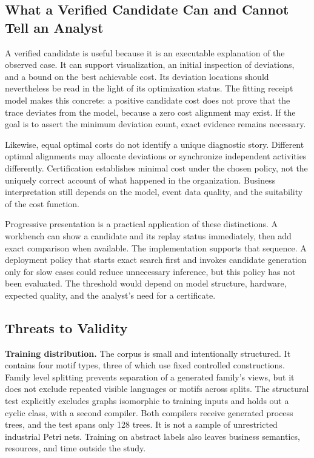 \subsection{What a Verified Candidate Can and Cannot Tell an Analyst}

A verified candidate is useful because it is an executable explanation of the observed case. It can support visualization, an initial inspection of deviations, and a bound on the best achievable cost. Its deviation locations should nevertheless be read in the light of its optimization status. The fitting receipt model makes this concrete: a positive candidate cost does not prove that the trace deviates from the model, because a zero cost alignment may exist. If the goal is to assert the minimum deviation count, exact evidence remains necessary.

Likewise, equal optimal costs do not identify a unique diagnostic story. Different optimal alignments may allocate deviations or synchronize independent activities differently. Certification establishes minimal cost under the chosen policy, not the uniquely correct account of what happened in the organization. Business interpretation still depends on the model, event data quality, and the suitability of the cost function.

Progressive presentation is a practical application of these distinctions. A workbench can show a candidate and its replay status immediately, then add exact comparison when available. The implementation supports that sequence. A deployment policy that starts exact search first and invokes candidate generation only for slow cases could reduce unnecessary inference, but this policy has not been evaluated. The threshold would depend on model structure, hardware, expected quality, and the analyst's need for a certificate.

\subsection{Threats to Validity}
\label{sec:validity}

\begin{revised}\textbf{Training distribution.} The corpus is small and intentionally structured. It contains four motif types, three of which use fixed controlled constructions. Family level splitting prevents separation of a generated family's views, but it does not exclude repeated visible languages or motifs across splits. The structural test explicitly excludes graphs isomorphic to training inputs and holds out a cyclic class, with a second compiler. Both compilers receive generated process trees, and the test spans only 128 trees. It is not a sample of unrestricted industrial Petri nets. Training on abstract labels also leaves business semantics, resources, and time outside the study.\end{revised}


